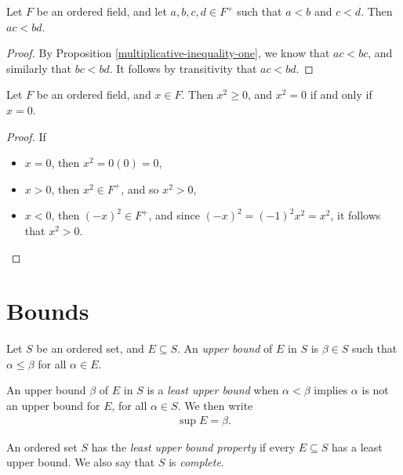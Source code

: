 \begin{prop}\label{multiplicative-inequality-two}
    Let $F$ be an ordered field, and let $a, b, c, d \in F^+$ such that $a < b$ and $c < d$. Then $ac < bd$.
\end{prop}

\begin{proof}
    By Proposition \ref{multiplicative-inequality-one}, we know that $ac < bc$, and similarly that $bc < bd$. It follows by transitivity that $ac < bd$.
\end{proof}

\begin{prop}\label{square-is-positive-or-zero}
    Let $F$ be an ordered field, and $x \in F$. Then $x^2 \geq 0$, and $x^2 = 0$ if and only if $x = 0$.
\end{prop}

\begin{proof}
    If
    \begin{itemize}
        \item $x = 0$, then $x^2 = 0(0) = 0$,
        \item $x > 0$, then $x^2 \in F^+$, and so $x^2 > 0$,
        \item $x < 0$, then $(-x)^2 \in F^+$, and since $(-x)^2 = (-1)^2x^2 = x^2$, it follows that $x^2 > 0$.
    \end{itemize}
\end{proof}

\section{Bounds}

\begin{defn}
    Let $S$ be an ordered set, and $E \subseteq S$. An \emph{upper bound} of $E$ in $S$ is $\beta \in S$ such that $\alpha \leq \beta$ for all $\alpha \in E$.
\end{defn}

\begin{defn}
    An upper bound $\beta$ of $E$ in $S$ is a \emph{least upper bound} when $\alpha < \beta$ implies $\alpha$ is not an upper bound for $E$, for all $\alpha \in S$. We then write
    \begin{align*}
        \sup E = \beta.
    \end{align*}
\end{defn}

\begin{defn}
    An ordered set $S$ has the \emph{least upper bound property} if every $E \subseteq S$ has a least upper bound. We also say that $S$ is \emph{complete}.
\end{defn}


